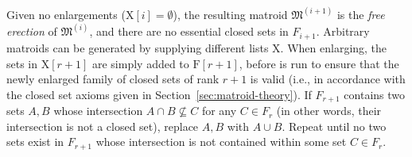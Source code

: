 

Given no enlargements ($\mathrm{X}[i] = \emptyset$), the resulting matroid $\mathfrak{M}^{(i+1)}$ is the \textit{free erection} of $\mathfrak{M}^{(i)}$, and there are no essential closed sets in $F_{i+1}$. Arbitrary matroids can be generated by supplying different lists $\mathrm{X}$. When enlarging, the sets in $\mathrm{X}[r+1]$ are simply added to $\mathrm{F}[r+1]$, before  is run to ensure that the newly enlarged family of closed sets of rank $r+1$ is valid (i.e., in accordance with the closed set axioms given in Section~\ref{sec:matroid-theory}). If $F_{r+1}$ contains two sets $A,B$ whose intersection $A \cap B \not \subseteq C$ for any $C \in F_{r}$ (in other words, their intersection is not a closed set), replace $A,B$ with $A \cup B$. Repeat until no two sets exist in $F_{r+1}$ whose intersection is not contained within some set $C \in F_{r}$.

